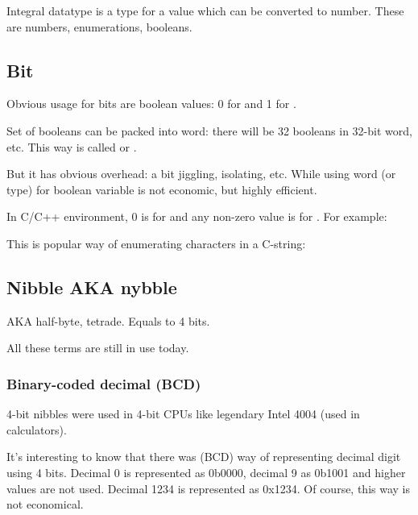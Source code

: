 
Integral datatype is a type for a value which can be converted to number.
These are numbers, enumerations, booleans.

\subsection{Bit}

Obvious usage for bits are boolean values: 0 for  and 1 for .

Set of booleans can be packed into \gls{word}: there will be 32 booleans in 32-bit word, etc.
This way is called  or .

But it has obvious overhead: a bit jiggling, isolating, etc.
While using \gls{word} (or  type) for boolean variable is not economic, but highly efficient.

In C/C++ environment, 0 is for  and any non-zero value is for .
For example:



This is popular way of enumerating characters in a C-string:



\subsection{Nibble AKA nybble}

\ac{AKA} half-byte, tetrade.
Equals to 4 bits.

All these terms are still in use today.

\subsubsection{Binary-coded decimal (\ac{BCD})}
\label{BCD}


4-bit nibbles were used in 4-bit CPUs like legendary Intel 4004 (used in calculators).

It's interesting to know that there was  (\ac{BCD}) way of representing decimal digit using 4 bits.
Decimal 0 is represented as 0b0000, decimal 9 as 0b1001 and higher values are not used.
Decimal 1234 is represented as 0x1234.
Of course, this way is not economical.

